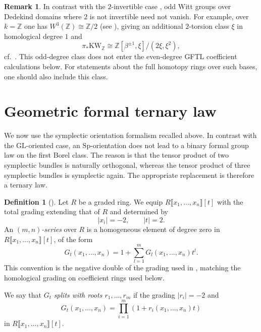\documentclass[a4paper]{amsart}
\theoremstyle{plain}
\theoremstyle{definition}
\newtheorem{definition}[subsubsection]{Definition}
\newtheorem{remark}[subsubsection]{Remark}
\newcommand{\Sp}{\mathrm{Sp}}
\newcommand{\KW}{\mathrm{KW}}
\newcommand{\ZZ}{\mathbb{Z}}
\begin{document}
\begin{remark}\label{rem:odd-witt-classes}
	In contrast with the $2$-invertible case \cite[Theorem~1.5.22]{balmer2005witt}, odd Witt groups over Dedekind domains where $2$ is not invertible need not vanish. For example, over $k=\ZZ$ one has $W^{3}(\ZZ)\cong \ZZ/2$ (see \cite[Proposition~4.3.1]{ranicki1981exact}), giving an additional $2$-torsion class $\xi$ in homological degree $1$ and
	\[
		\pi_*\KW_{\ZZ}\cong \ZZ[\beta^{\pm 1},\xi]/(2\xi,\xi^2),
	\]
	cf.~\cite[Theorem 10.13]{kolderup2025hermitian}. This odd-degree class does not enter the even-degree GFTL coefficient calculations below. For statements about the full homotopy rings over such bases, one should also include this class.
\end{remark}

\section{Geometric formal ternary law}\label{sec:geometric-formal-ternary-law}

We now use the symplectic orientation formalism recalled above. In contrast with the $\mathrm{GL}$-oriented case, an $\Sp$-orientation does not lead to a binary formal group law on the first Borel class. The reason is that the tensor product of two symplectic bundles is naturally orthogonal, whereas the tensor product of three symplectic bundles is symplectic again. The appropriate replacement is therefore a ternary law.

\begin{definition}[\cite{coulette2024formal}]
	Let $R$ be a graded ring. We equip $R\llbracket x_1,\ldots,x_n\rrbracket[t]$ with the total grading extending that of $R$ and determined by
	\[
		|x_i|=-2,\qquad |t|=2.
	\]
	An \emph{$(m,n)$-series} over $R$ is a homogeneous element of degree zero in $R\llbracket x_1,\ldots,x_n\rrbracket[t]$, of the form
	\[
		G_t(x_1,\ldots,x_n)=1+\sum_{l=1}^m G_l(x_1,\ldots,x_n)t^l.
	\]
	This convention is the negative double of the grading used in \cite[\S~2.1.4]{coulette2024formal}, matching the homological grading on coefficient rings used below.

	We say that $G_t$ \emph{splits with roots $r_1,\ldots,r_m$} if the grading $|r_i|=-2$ and
	\[
		G_t(x_1,\ldots,x_n)=\prod_{i=1}^m (1+r_i(x_1,\ldots,x_n)t)
	\]
	in $R\llbracket x_1,\ldots,x_n\rrbracket[t]$.
\end{definition}
\end{document}
